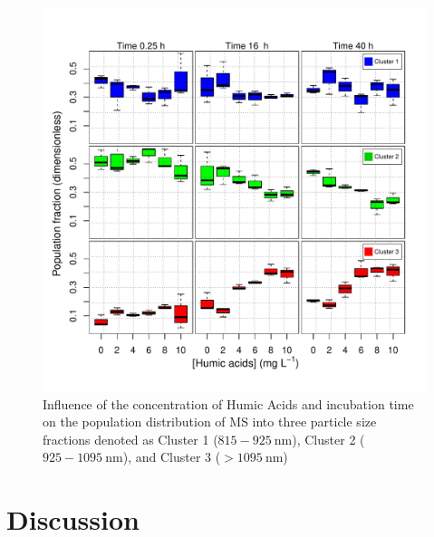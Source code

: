 \documentclass[journal=langd5,manuscript=article]{achemso}
\begin{document}
\begin{figure}
 \includegraphics[width=\linewidth]{Figures/Boxplot_MS_HA_CaCl2_populations.pdf}
  \caption{Influence of the concentration of Humic Acids and incubation  time on the population distribution of MS into three particle size fractions denoted as
  Cluster 1 ($815 - 925~\mathrm{nm}$),  Cluster 2 ($925 - 1095~\mathrm{nm}$), 
  and
  Cluster 3 ($ > 1095~\mathrm{nm}$)
  }
  \label{fgr:boxplot_populations}
\end{figure}






\section{Discussion}
\end{document}
